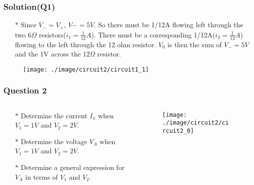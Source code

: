 \documentclass{beamer}
\begin{document}

\begin{frame}
\frametitle{Solution(Q1)}

\begin{itemize} \itemsep1pt \parskip0pt 
  \item[$\ast$] Since $V_- = V_+$, $V - = 5V$. So there must be 1/12A flowing left through the two $6\Omega$ resistors($i_1 = \frac{1}{12}A$). There must be a corresponding 1/12A($i_2 = \frac{1}{12}A$) flowing to the left through the 12 ohm resistor. $V_0$ is then the sum of $V_- = 5V$ and the 1V across the $12\Omega$ resistor.
\end{itemize}



\begin{figure}[H]
  \centering
  \texttt{[image: ./image/circuit2/circuit1\_1]}
\end{figure}


\end{frame}


\begin{frame}
\frametitle{Question 2}
\begin{columns}
\begin{column}{6cm}
\begin{itemize} \itemsep1pt \parskip0pt 
  \item[$\ast$]Determine the current $I_x$ when $V_1 = 1V$ and $V_2 = 2V$.
  \item[$\ast$]Determine the voltage $V_A$ when $V_1 = 1V$ and $V_2 = 2V$.
  \item[$\ast$]Determine a general expression for $V_A$ in terms of $V_1$ and $V_2$.
\end{itemize}
\end{column}

\begin{column}{6cm}
\begin{figure}[H]
  \centering
  \texttt{[image: ./image/circuit2/circuit2\_0]}
\end{figure}
\end{column}
\end{columns}

\end{frame}
\end{document}
